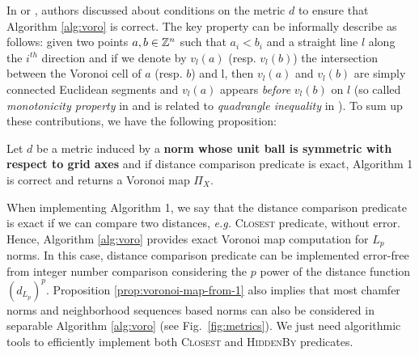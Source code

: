 \documentclass{llncs}
\begin{document}
In \cite{Hirata} or \cite{Maurer2003}, authors discussed about
conditions on the metric $d$ to ensure that Algorithm \ref{alg:voro}
is correct. The key property can be informally describe as follows:
given two points $a,b\in{\mathbb{Z}}^n$ such that $a_i<b_i$ and a straight line
$l$ along the $i^{th}$ direction and if we denote by $v_l(a)$
(resp. $v_l(b)$) the intersection between the Voronoi cell of $a$
(resp. $b$) and l, then $v_l(a)$ and $v_l(b)$ are simply connected
Euclidean segments and $v_l(a)$ appears \emph{before} $v_l(b)$ on $l$
(so called \emph{monotonicity property} in \cite{Maurer2003} and is
related to \emph{quadrangle inequality} in \cite{Hirata}).  To sum
up these contributions, we have the following proposition:
\begin{proposition}
\label{prop:voronoi-map-from-1}
  Let $d$ be a metric induced by a \textbf{norm whose unit ball is
    symmetric with respect to grid axes} and if distance comparison
  predicate is exact, Algorithm 1 is correct and returns a Voronoi map
  $\Pi_X$.
\end{proposition}
When implementing Algorithm 1, we say that the distance comparison
predicate is exact if we can compare two distances, \emph{e.g.}
\textsc{Closest} predicate, without error. Hence, Algorithm \ref{alg:voro}
provides exact Voronoi map computation for $L_p$ norms. In this case,
distance comparison predicate can be implemented error-free from
integer number comparison considering the $p$ power of the distance
function $\left (d_{L_p}\right)^p$.  Proposition
\ref{prop:voronoi-map-from-1} also implies that most chamfer norms and
neighborhood sequences based norms can also be considered in separable
Algorithm \ref{alg:voro} (see Fig.~\ref{fig:metrics}). We just need
algorithmic tools to efficiently implement both \textsc{Closest} and
\textsc{HiddenBy} predicates.
\end{document}
